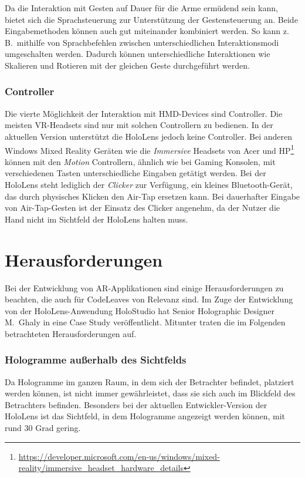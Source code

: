 Da die Interaktion mit Gesten auf Dauer für die Arme ermüdend sein kann, bietet sich die Sprachsteuerung zur Unterstützung der Gestensteuerung an. Beide Eingabemethoden können auch gut miteinander kombiniert werden. So kann z.\,B.\ mithilfe von Sprachbefehlen zwischen unterschiedlichen Interaktionsmodi umgeschalten werden. Dadurch können unterschiedliche Interaktionen wie Skalieren und Rotieren mit der gleichen Geste durchgeführt werden.

\subsubsection*{Controller}
Die vierte Möglichkeit der Interaktion mit HMD-Devices sind Controller. Die meisten VR-Headsets sind nur mit solchen Controllern zu bedienen. In der aktuellen Version unterstützt die HoloLens jedoch keine Controller. Bei anderen Windows Mixed Reality Geräten wie die \textit{Immersive} Headsets von Acer und HP\footnote{\url{https://developer.microsoft.com/en-us/windows/mixed-reality/immersive_headset_hardware_details}} können mit den \textit{Motion} Controllern, ähnlich wie bei Gaming Konsolen, mit verschiedenen Tasten unterschiedliche Eingaben getätigt werden. Bei der HoloLens steht lediglich der \textit{Clicker} zur Verfügung, ein kleines Bluetooth-Gerät, das durch physisches Klicken den Air-Tap ersetzen kann. Bei dauerhafter Eingabe von Air-Tap-Gesten ist der Einsatz des Clicker angenehm, da der Nutzer die Hand nicht im Sichtfeld der HoloLens halten muss.

\section{Herausforderungen}

Bei der Entwicklung von AR-Applikationen sind einige Herausforderungen zu beachten, die auch für CodeLeaves von Relevanz sind. Im Zuge der Entwicklung von der HoloLens-Anwendung HoloStudio hat Senior Holographic Designer M.\ Ghaly in \cite{windows2017casestudy3} eine Case Study veröffentlicht. Mitunter traten die im Folgenden betrachteten Herausforderungen auf.

\subsubsection*{Hologramme außerhalb des Sichtfelds}

Da Hologramme im ganzen Raum, in dem sich der Betrachter befindet, platziert werden können, ist nicht immer gewährleistet, dass sie sich auch im Blickfeld des Betrachters befinden. Besonders bei der aktuellen Entwickler-Version der HoloLens ist das Sichtfeld, in dem Hologramme angezeigt werden können, mit rund 30 Grad \cite{czerulla2017microsoft} gering.

